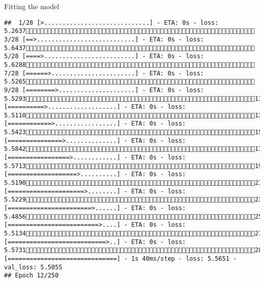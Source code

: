 \documentclass[
  ignorenonframetext,
]{beamer}
\begin{document}
\begin{frame}[fragile]{Fitting the model}
\begin{verbatim}
##  1/28 [>.............................] - ETA: 0s - loss: 5.2637 3/28 [==>...........................] - ETA: 0s - loss: 5.6437 5/28 [====>.........................] - ETA: 0s - loss: 5.6288 7/28 [======>.......................] - ETA: 0s - loss: 5.5265 9/28 [========>.....................] - ETA: 0s - loss: 5.529311/28 [==========>...................] - ETA: 0s - loss: 5.511013/28 [============>.................] - ETA: 0s - loss: 5.542315/28 [===============>..............] - ETA: 0s - loss: 5.584217/28 [=================>............] - ETA: 0s - loss: 5.571319/28 [===================>..........] - ETA: 0s - loss: 5.519021/28 [=====================>........] - ETA: 0s - loss: 5.522923/28 [=======================>......] - ETA: 0s - loss: 5.485625/28 [=========================>....] - ETA: 0s - loss: 5.513427/28 [===========================>..] - ETA: 0s - loss: 5.573128/28 [==============================] - 1s 40ms/step - loss: 5.5651 - val_loss: 5.5055
## Epoch 12/250

\end{verbatim}
\end{frame}
\end{document}

